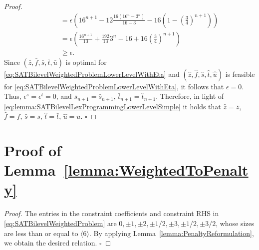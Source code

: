 \documentclass[runningheads,orivec]{llncs}
\newcommand{\MacroColor}[1]{#1}
\newcommand{\MyQED}{\mbox{}\hfill$\square$}
\newcommand{\Size}[1]{\langle#1\rangle}
\newcommand{\NVariables}{\MacroColor{n}}
\newcommand{\ReformZ}{\MacroColor{z}}
\newcommand{\ReformAugFrac}{\MacroColor{f}}
\newcommand{\LexLVarS}{\MacroColor{s}}
\newcommand{\LexLVarT}{\MacroColor{t}}
\newcommand{\LexLVarU}{\MacroColor{u}}
\newcommand{\LexWeightValue}{\MacroColor{16}}
\begin{document}
\begin{appendix}
\begin{proof}
\begin{align*}
&
\qquad
=
\epsilon \left(
\LexWeightValue^{\NVariables + 1}
-
12
\frac{\LexWeightValue (\LexWeightValue^{\NVariables} - 3^{\NVariables})}{\LexWeightValue - 3}
- 
16
\left(1 - \left(\frac{3}{4}\right)^{\NVariables + 1}\right)
\right)
\\
&
\qquad
=
\epsilon \left(
\frac{\LexWeightValue^{\NVariables + 1}}{13}
+
\frac{192}{13} 3^{\NVariables}
-
16
+
16
\left(\frac{3}{4}\right)^{\NVariables + 1}
\right)
\\
&
\qquad
\ge
\epsilon.
\end{align*}
Since $(\bar{\ReformZ}, \bar{\ReformAugFrac}, \bar{\LexLVarS}, \bar{\LexLVarT}, \bar{\LexLVarU})$ is optimal for \eqref{eq:SATBilevelWeightedProblemLowerLevelWithEta} and $(\hat{\ReformZ}, \hat{\ReformAugFrac}, \hat{\LexLVarS}, \hat{\LexLVarT}, \hat{\LexLVarU})$ is feasible for \eqref{eq:SATBilevelWeightedProblemLowerLevelWithEta}, it follows that $\epsilon = 0$.
Thus, $\epsilon^{\LexLVarS} = \epsilon^{\LexLVarT} = 0$, and $\bar{\LexLVarS}_{\NVariables + 1} = \hat{\LexLVarS}_{\NVariables + 1}$, $\bar{\LexLVarT}_{\NVariables + 1} = \hat{\LexLVarT}_{\NVariables + 1}$.
Therefore, in light of \eqref{eq:lemma:SATBilevelLexProgrammingLowerLevelSimple} it holds that $\hat{\ReformZ} = \bar{\ReformZ}$, $\hat{\ReformAugFrac} = \bar{\ReformAugFrac}$, $\hat{\LexLVarS} = \bar{\LexLVarS}$, $\hat{\LexLVarT} = \bar{\LexLVarT}$, $\hat{\LexLVarU} = \bar{\LexLVarU}$.
\MyQED
\end{proof}

\section{Proof of Lemma~\ref{lemma:WeightedToPenalty}}
\label{sec:ProofOfLemmaWeightedToPenalty}

\begin{proof}
The entries in the constraint coefficients and constraint RHS in \eqref{eq:SATBilevelWeightedProblem} are $0, \pm 1, \pm 2, \pm 1/2, \pm 3, \pm 1/2, \pm 3/2$, whose sizes are less than or equal to $\Size{6}$.
By applying Lemma~\ref{lemma:PenaltyReformulation}, we obtain the desired relation.
\MyQED
\end{proof}


\end{appendix}
\end{document}

